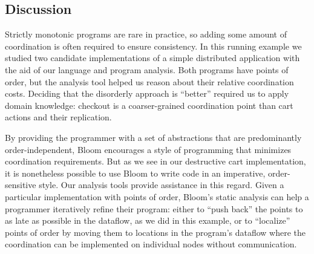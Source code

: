 
\subsection{Discussion}
Strictly monotonic programs
are rare in practice, so adding some amount of coordination is often required to
ensure consistency. In this running example we studied
two candidate implementations of a simple distributed application with the aid of
our language and program analysis. Both programs have points of order, but the analysis tool helped us reason about their relative coordination costs.  Deciding that the disorderly
approach is ``better'' required us to apply domain knowledge: checkout is a coarser-grained coordination point than cart actions and their replication.

By providing the programmer with a set of abstractions that are predominantly
order-independent, Bloom encourages a style of programming that minimizes
coordination requirements. But as we see in our destructive cart implementation,
it is nonetheless possible to use Bloom to write code in an imperative,
order-sensitive style. Our analysis tools provide assistance in this regard.  Given a
particular implementation with points of order, Bloom's static analysis can help
a programmer iteratively refine their program: either to ``push back'' the
points to as late as possible in the dataflow, as we did in this example, or to
``localize'' points of order by moving them to locations in the program's dataflow
where the coordination can be implemented on individual nodes without
communication.
